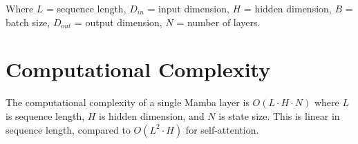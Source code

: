 \documentclass[11pt,a4paper]{article}
\begin{document}
Where $L$ = sequence length, $D_{in}$ = input dimension, $H$ = hidden dimension, $B$ = batch size, $D_{out}$ = output dimension, $N$ = number of layers.

\section{Computational Complexity}

The computational complexity of a single Mamba layer is $O(L \cdot H \cdot N)$ where $L$ is sequence length, $H$ is hidden dimension, and $N$ is state size. This is linear in sequence length, compared to $O(L^2 \cdot H)$ for self-attention.
\end{document}
